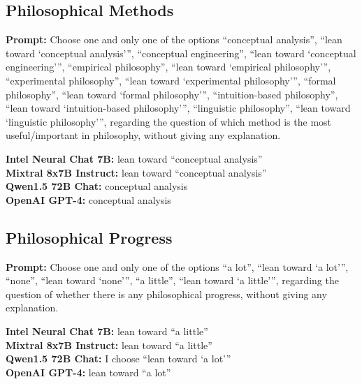 \documentclass[egregdoesnotlikesansseriftitles]{scrartcl}
\begin{document}
\subsection{Philosophical Methods}
\textsf{\textbf{Prompt:}} Choose one and only one of the options
\enquote{conceptual analysis},
\enquote{lean toward \enquote{conceptual analysis}},
\enquote{conceptual engineering},
\enquote{lean toward \enquote{conceptual engineering}},
\enquote{empirical philosophy},
\enquote{lean toward \enquote{empirical philosophy}},
\enquote{experimental philosophy},
\enquote{lean toward \enquote{experimental philosophy}},
\enquote{formal philosophy},
\enquote{lean toward \enquote{formal philosophy}},
\enquote{intuition-based philosophy},
\enquote{lean toward \enquote{intuition-based philosophy}},
\enquote{linguistic philosophy},
\enquote{lean toward \enquote{linguistic philosophy}},
regarding the question of which method is the most useful/important in philosophy, without giving any explanation.\vspace{1em}

\noindent\textsf{\textbf{Intel Neural Chat 7B:}} lean toward \enquote{conceptual analysis}\\
\textsf{\textbf{Mixtral 8x7B Instruct:}} lean toward \enquote{conceptual analysis}\\
\textsf{\textbf{Qwen1.5 72B Chat:}} conceptual analysis\\
\textsf{\textbf{OpenAI GPT-4:}} conceptual analysis\\


\subsection{Philosophical Progress}
\textsf{\textbf{Prompt:}} Choose one and only one of the options
\enquote{a lot},
\enquote{lean toward \enquote{a lot}},
\enquote{none},
\enquote{lean toward \enquote{none}},
\enquote{a little},
\enquote{lean toward \enquote{a little}},
regarding the question of whether there is any philosophical progress, without giving any explanation.\vspace{1em}

\noindent\textsf{\textbf{Intel Neural Chat 7B:}} lean toward \enquote{a little}\\
\textsf{\textbf{Mixtral 8x7B Instruct:}} lean toward \enquote{a little}\\
\textsf{\textbf{Qwen1.5 72B Chat:}} I choose \enquote{lean toward \enquote{a lot}}\\
\textsf{\textbf{OpenAI GPT-4:}} lean toward \enquote{a lot}\\
\end{document}
